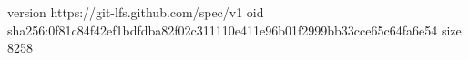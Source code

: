 version https://git-lfs.github.com/spec/v1
oid sha256:0f81c84f42ef1bdfdba82f02c311110e411e96b01f2999bb33cce65c64fa6e54
size 8258
